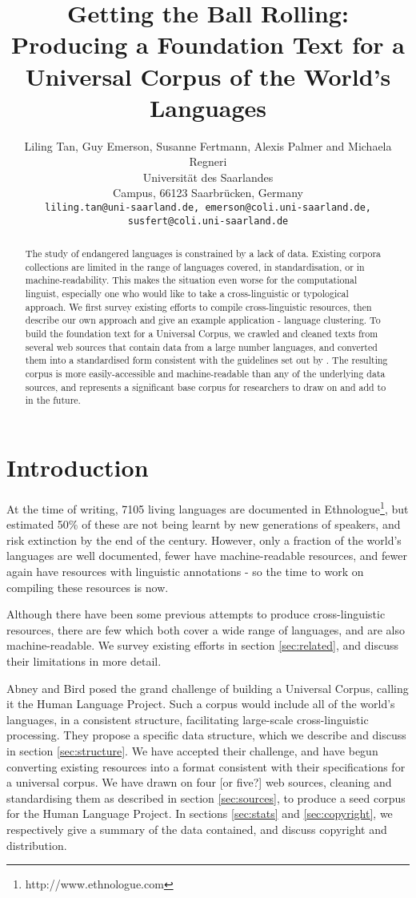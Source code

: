 \documentclass[11pt]{article}
\title{Getting the Ball Rolling: Producing a Foundation Text for a Universal Corpus of the World's Languages}
\author{Liling Tan, Guy Emerson, Susanne Fertmann, Alexis Palmer and Michaela Regneri \\
  Universität des Saarlandes \\
  Campus, 66123 Saarbrücken, Germany \\
  {\tt liling.tan@uni-saarland.de, emerson@coli.uni-saarland.de,} \\
  {\tt susfert@coli.uni-saarland.de}}
\date{}
\begin{document}
\maketitle
\begin{abstract}
The study of endangered languages is constrained by a lack of data. Existing corpora collections are limited in the range of languages covered, in standardisation, or in machine-readability. This makes the situation even worse for the computational linguist, especially one who would like to take a cross-linguistic or typological approach. We first survey existing efforts to compile cross-linguistic resources, then describe our own approach and give an example application - language clustering. To build the foundation text for a Universal Corpus, we crawled and cleaned texts from several web sources that contain data from a large number languages, and converted them into a standardised form consistent with the guidelines set out by . The resulting corpus is more easily-accessible and machine-readable than any of the underlying data sources, and represents a significant base corpus for researchers to draw on and add to in the future.
\end{abstract}

\section{Introduction}

At the time of writing, 7105 living languages are documented in Ethnologue\footnote{http://www.ethnologue.com}, but  estimated 50\% of these are not being learnt by new generations of speakers, and risk extinction by the end of the century. However, only a fraction of the world's languages are well documented, fewer have machine-readable resources, and fewer again have resources with linguistic annotations \cite{maxwell2006annotation} - so the time to work on compiling these resources is now.

Although there have been some previous attempts to produce cross-linguistic resources, there are few which both cover a wide range of languages, and are also machine-readable. We survey existing efforts in section \ref{sec:related}, and discuss their limitations in more detail.

Abney and Bird  posed the grand challenge of building a Universal Corpus, calling it the Human Language Project. Such a corpus would include all of the world's languages, in a consistent structure, facilitating large-scale cross-linguistic processing. They propose a specific data structure, which we describe and discuss in section \ref{sec:structure}. We have accepted their challenge, and have begun converting existing resources into a format consistent with their specifications for a universal corpus. We have drawn on four [or five?] web sources, cleaning and standardising them as described in section \ref{sec:sources}, to produce a seed corpus for the Human Language Project. In sections \ref{sec:stats} and \ref{sec:copyright}, we respectively give a summary of the data contained, and discuss copyright and distribution.
\end{document}
